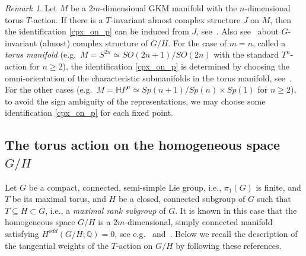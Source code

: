 \documentclass{amsart}
\theoremstyle{definition}
\theoremstyle{remark}
\newtheorem{remark}[theorem]{Remark}
\numberwithin{equation}{section}
\begin{document}
\begin{remark}
\label{sign_ambiguities}
Let $M$ be a $2m$-dimensional GKM manifold with the $n$-dimensional torus $T$-action.
If there is a $T$-invariant almost complex structure $J$ on $M$, then the identification \eqref{cpx_on_p} can be induced from $J$, see~\cite{GZ, GHZ}.
Also see~\cite[Section 12 and Proposition 13.5]{BoHi} about $G$-invariant (almost) complex structure of $G/H$.
For the case of $m=n$, called a {\it torus manifold} (e.g.~$M=S^{2n}\simeq SO(2n+1)/SO(2n)$ with the standard $T^{n}$-action for $n\ge 2$),
the identification \eqref{cpx_on_p} is determined by choosing the omni-orientation of the characteristic submanifolds in the torus manifold, see~\cite{MMP, Ku16}.
For the other cases (e.g.~$M=\mathbb{H}P^{n}\simeq Sp(n+1)/Sp(n)\times Sp(1)$ for $n\ge 2$), to avoid the sign ambiguity of the representations, 
we may choose some identification \eqref{cpx_on_p} for each fixed point.
\end{remark}

\subsection{The torus action on the homogeneous space $G/H$}
\label{sect:2.3}
Let $G$ be a compact, connected, semi-simple Lie group, i.e., $\pi_{1}(G)$ is finite, and 
$T$ be its maximal torus, and $H$ be a closed, connected subgroup of $G$ such that $T\subseteq H\subset G$, i.e., a {\it maximal rank subgroup} of $G$.
It is known in this case that 
the homogeneous space $G/H$ is a $2m$-dimensional, simply connected manifold satisfying $H^{odd}(G/H;\mathbb{Q})=0$, see e.g.~\cite{MiTo, Bu} and~\cite[Theorem 2.4]{GHZ}.
Below we recall the description of the tangential weights of the $T$-action on $G/H$ by following these references.
\end{document}

